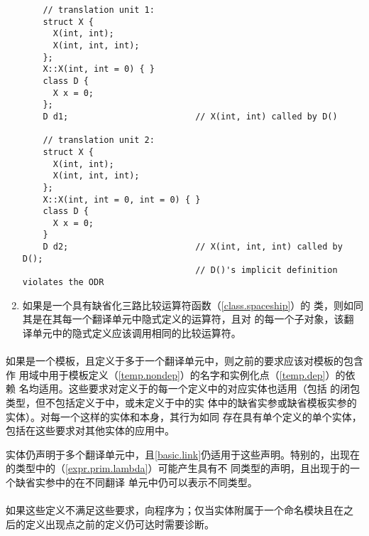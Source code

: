 \begin{enumerate}
        \begin{example} %
          \begin{lstlisting}
    // translation unit 1:
    struct X {
      X(int, int);
      X(int, int, int);
    };
    X::X(int, int = 0) { }
    class D {
      X x = 0;
    };
    D d1;                         // X(int, int) called by D()

    // translation unit 2:
    struct X {
      X(int, int);
      X(int, int, int);
    };
    X::X(int, int = 0, int = 0) { }
    class D {
      X x = 0;
    }
    D d2;                         // X(int, int, int) called by D();
                                  // D()'s implicit definition violates the ODR
          \end{lstlisting}
        \end{example}
  \item 如果是一个具有缺省化三路比较运算符函数（\ref{class.spaceship}）的
        类，则如同其是在其\odrused{}每一个翻译单元中隐式定义的运算符，且对
        的每一个子对象，该翻译单元中的隐式定义应该调用相同的比较运算符。
\end{enumerate}

\paragraph{} %
如果是一个模板，且定义于多于一个翻译单元中，则之前的要求应该对模板的包含作
用域中用于模板定义（\ref{temp.nondep}）的名字和实例化点（\ref{temp.dep}）的依赖
名均适用。这些要求对定义于的每一个定义中的对应实体也适用（包括
的闭包类型，但不包括定义于中，或未定义于中的实
体中的缺省实参或缺省模板实参的实体）。对每一个这样的实体和本身，其行为如同
存在具有单个定义的单个实体，包括在这些要求对其他实体的应用中。

\begin{note}
  实体仍声明于多个翻译单元中，且\ref{basic.link}仍适用于这些声明。特别的，出现在
  的类型中的（\ref{expr.prim.lambda}）可能产生具有不
  同类型的声明，且出现于的一个缺省实参中的在不同翻译
  单元中仍可以表示不同类型。
\end{note}

\paragraph{} %
如果这些定义不满足这些要求，向程序为\illform{}；仅当实体附属于一个命名模块且在之
后的定义出现点之前的定义仍可达时需要诊断。

